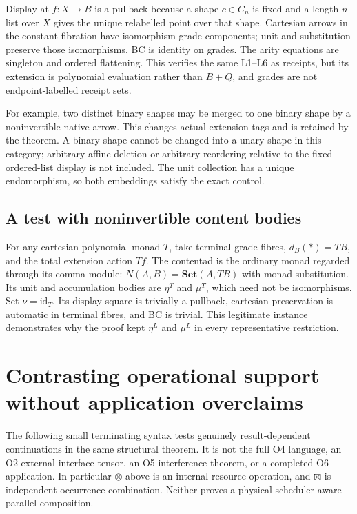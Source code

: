 \documentclass[11pt,a4paper]{article}
\theoremstyle{definition}
\newcommand{\Set}{\mathbf{Set}}
\newcommand{\id}{\mathrm{id}}
\begin{document}
Display at $f:X\to B$ is a pullback because a shape $c\in C_n$ is fixed and
a length-$n$ list over $X$ gives the unique relabelled point over that shape.
Cartesian arrows in the constant fibration have isomorphism grade components;
unit and substitution preserve those isomorphisms. BC is identity on grades.
The arity equations are singleton and ordered flattening. This verifies the
same L1--L6 as receipts, but its extension is polynomial evaluation rather
than $B+Q$, and grades are not endpoint-labelled receipt sets.

For example, two distinct binary shapes may be merged to one binary shape by
a noninvertible native arrow. This changes actual extension tags and is
retained by the theorem. A binary shape cannot be changed into a unary shape
in this category; arbitrary affine deletion or arbitrary reordering relative
to the fixed ordered-list display is not included. The unit collection has a
unique endomorphism, so both embeddings satisfy the exact control.

\subsection{A test with noninvertible content bodies}
For any cartesian polynomial monad $T$, take terminal grade fibres,
$d_B(*)=TB$, and the total extension action $Tf$. The contentad is the ordinary
monad regarded through its comma module: $N(A,B)=\Set(A,TB)$ with monad
substitution. Its unit and accumulation bodies are $\eta^T$ and $\mu^T$,
which need not be isomorphisms. Set $\nu=\id_T$. Its display square is
trivially a pullback, cartesian preservation is automatic in terminal fibres,
and BC is trivial. This legitimate instance demonstrates why the proof kept
$\eta^L$ and $\mu^L$ in every representative restriction.

\section{Contrasting operational support without application overclaims}\label{sec:fixtures}

The following small terminating syntax tests genuinely result-dependent
continuations in the same structural theorem. It is not the full O4 language,
an O2 external interface tensor, an O5 interference theorem, or a completed O6
application. In particular $\otimes$ above is an internal resource operation,
and $\boxtimes$ is independent occurrence combination. Neither proves a
physical scheduler-aware parallel composition.
\end{document}
